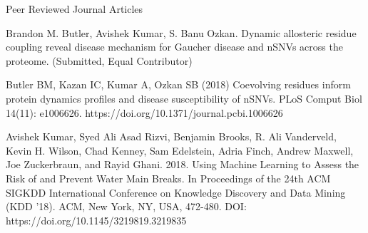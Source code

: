 \begin{cventries}
\cventry
    {}
    {Peer Reviewed Journal Articles}
    {}
    {}
    {
\begin{cvitems}
    \vspace{-1\baselineskip}
    \setlength\itemsep{.5em}
    \item Brandon M. Butler, Avishek Kumar, S. Banu Ozkan. Dynamic allosteric residue coupling reveal disease mechanism for Gaucher disease and nSNVs across the proteome. (Submitted, Equal Contributor)
    \item Butler BM, Kazan IC, Kumar A, Ozkan SB (2018) Coevolving residues inform protein dynamics profiles and disease susceptibility of nSNVs. PLoS Comput Biol 14(11): e1006626. https://doi.org/10.1371/journal.pcbi.1006626
    \item Avishek Kumar, Syed Ali Asad Rizvi, Benjamin Brooks, R. Ali Vanderveld, Kevin H. Wilson, Chad
Kenney, Sam Edelstein, Adria Finch, Andrew Maxwell, Joe Zuckerbraun, and Rayid Ghani. 2018.
Using Machine Learning to Assess the Risk of and Prevent Water Main Breaks. In Proceedings of the
24th ACM SIGKDD International Conference on Knowledge Discovery and Data Mining (KDD '18).
ACM, New York, NY, USA, 472-480. DOI: https://doi.org/10.1145/3219819.3219835
\end{cvitems}
}


\end{cventries}

